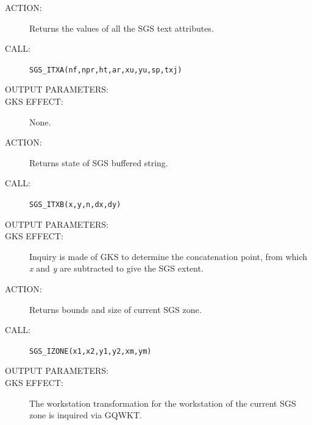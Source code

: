 \documentclass[11pt]{article}
\begin{document}
\begin{description}
\item [ACTION:]
Returns the values of all the SGS text attributes.
\item [CALL:]
{\tt SGS\_ITXA(nf,npr,ht,ar,xu,yu,sp,txj)}
\item [OUTPUT PARAMETERS:]
\begin{params}
\end{params}
\item [GKS EFFECT:]
None.
\end{description}
\goodbreak

\begin{description}
\item [ACTION:]
Returns state of SGS buffered string.
\item [CALL:]
{\tt SGS\_ITXB(x,y,n,dx,dy)}
\item [OUTPUT PARAMETERS:]
\begin{params}
\end{params}
\item [GKS EFFECT:]
Inquiry is made of GKS to determine the concatenation point, from 
which {\em x}\/ and {\em y}\/ are subtracted to give the SGS extent.
\end{description}
\goodbreak

\begin{description}
\item [ACTION:]
Returns bounds and size of current SGS zone.
\item [CALL:]
{\tt SGS\_IZONE(x1,x2,y1,y2,xm,ym)}
\item [OUTPUT PARAMETERS:]
\begin{params}
\end{params}
\item [GKS EFFECT:]
The workstation transformation for the workstation of the current SGS zone is
inquired via GQWKT.
\end{description}
\goodbreak
\end{document}
